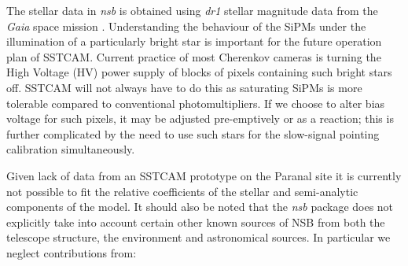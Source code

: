 The stellar data in \textit{nsb} is obtained using \textit{dr1} stellar magnitude data from the \textit{Gaia} space mission \cite{gaiadr1a} \cite{gaiadr1b}. Understanding the behaviour of the SiPMs under the illumination of a particularly bright star is important for the future operation plan of SSTCAM. Current practice of most Cherenkov cameras is turning the High Voltage (HV) power supply of blocks of pixels containing such bright stars off. SSTCAM will not always have to do this as saturating SiPMs is more tolerable compared to conventional photomultipliers. If we choose to alter bias voltage for such pixels, it may be adjusted pre-emptively or as a reaction; this is further complicated by the need to use such stars for the slow-signal pointing calibration simultaneously. 

Given lack of data from an SSTCAM prototype on the Paranal site it is currently not possible to fit the relative coefficients of the stellar and semi-analytic components of the model.  It should also be noted that the \textit{nsb} package does not explicitly take into account certain other known sources of NSB from both the telescope structure, the environment and astronomical sources. In particular we neglect contributions from:
